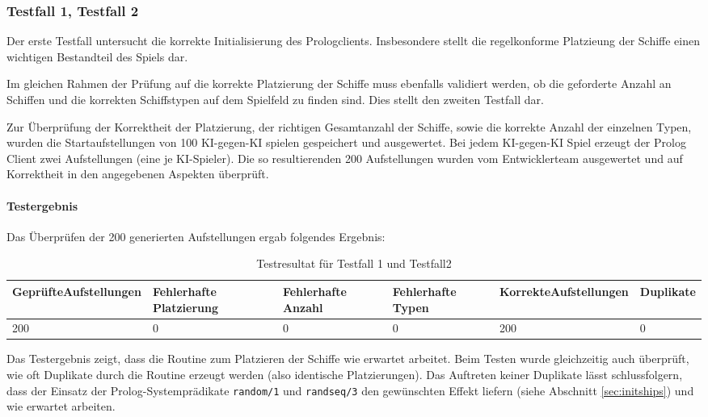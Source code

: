 	\subsubsection{Testfall 1, Testfall 2} %
	\label{ssub:testfall_1_testfall_2}
		Der erste Testfall untersucht die korrekte Initialisierung des Prologclients. Insbesondere stellt die regelkonforme Platzieung der
		Schiffe einen wichtigen Bestandteil des Spiels dar. 

		Im gleichen Rahmen der Prüfung auf die korrekte Platzierung der Schiffe muss ebenfalls validiert werden, ob die geforderte Anzahl an Schiffen und die
		korrekten Schiffstypen auf dem Spielfeld zu finden sind. Dies stellt den zweiten Testfall dar.
	
		Zur Überprüfung der Korrektheit der Platzierung, der richtigen Gesamtanzahl der Schiffe, sowie die korrekte Anzahl der einzelnen Typen, wurden 
		die Startaufstellungen von 100 KI-gegen-KI spielen gespeichert und ausgewertet. Bei jedem KI-gegen-KI Spiel erzeugt der Prolog Client zwei 
		Aufstellungen (eine je KI-Spieler). Die so resultierenden 200 Aufstellungen wurden vom Entwicklerteam ausgewertet und auf Korrektheit in den 
		angegebenen Aspekten überprüft.
		
		\paragraph{Testergebnis} %
		\label{par:testergebnis}
			Das Überprüfen der 200 generierten Aufstellungen ergab folgendes Ergebnis:
			\begin{table}[H] %
				\centering
				\begin{tabular}{|p{}|p{}|p{}|p{.15\textwidth}|p{}|p{}|} 
					\hline
					Geprüfte\newline Aufstellungen & Fehlerhafte Platzierung&Fehlerhafte Anzahl&Fehlerhafte Typen&Korrekte\newline Aufstellungen&Duplikate\\ 
					\hline\hline
					200 & 0 & 0 & 0 & 200 & 0\\
					\hline
				\end{tabular}
				\caption{Testresultat für Testfall 1 und Testfall2}
				\label{tbl:tf1tf2}
			\end{table}
		Das Testergebnis zeigt, dass die Routine zum Platzieren der Schiffe wie erwartet arbeitet. Beim Testen wurde gleichzeitig auch überprüft, 
		wie oft Duplikate durch die Routine erzeugt werden (also identische Platzierungen).
		Das Auftreten keiner Duplikate lässt schlussfolgern, dass der Einsatz der Prolog-Systemprädikate \texttt{random/1} und \texttt{randseq/3} 
		den gewünschten Effekt liefern (siehe Abschnitt \ref{sec:initships}) und wie erwartet arbeiten.
		
